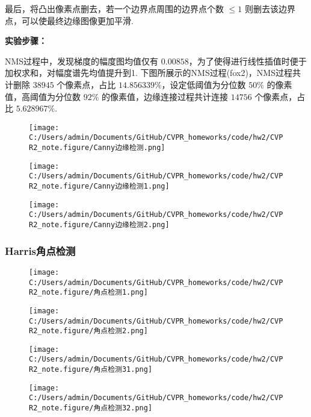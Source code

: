 \documentclass[
]{article}
\begin{document}
最后，将凸出像素点删去，若一个边界点周围的边界点个数 \(\leqslant 1\)
则删去该边界点，可以使最终边缘图像更加平滑.

\textbf{实验步骤：}

NMS过程中，发现梯度的幅度图均值仅有
\(0.00858\)，为了使得进行线性插值时便于加权求和，对幅度谱先均值提升到1.
下图所展示的NMS过程(fox2)，NMS过程共计删除 \(38945\) 个像素点，占比
\(14.856339\%\)，设定低阈值为分位数 \(50\%\) 的像素值，高阈值为分位数
\(92\%\) 的像素值，边缘连接过程共计连接 \(14756\) 个像素点，占比
\(5.628967\%\).

\begin{figure}
\centering
\texttt{[image: C:/Users/admin/Documents/GitHub/CVPR\_homeworks/code/hw2/CVPR2\_note.figure/Canny边缘检测.png]}
\caption{}
\end{figure}

\begin{figure}
\centering
\texttt{[image: C:/Users/admin/Documents/GitHub/CVPR\_homeworks/code/hw2/CVPR2\_note.figure/Canny边缘检测1.png]}
\caption{}
\end{figure}

\begin{figure}
\centering
\texttt{[image: C:/Users/admin/Documents/GitHub/CVPR\_homeworks/code/hw2/CVPR2\_note.figure/Canny边缘检测2.png]}
\caption{}
\end{figure}

\hypertarget{harrisux89d2ux70b9ux68c0ux6d4b}{%
\subsubsection{Harris角点检测}\label{harrisux89d2ux70b9ux68c0ux6d4b}}

\begin{figure}
\centering
\texttt{[image: C:/Users/admin/Documents/GitHub/CVPR\_homeworks/code/hw2/CVPR2\_note.figure/角点检测1.png]}
\caption{}
\end{figure}

\begin{figure}
\centering
\texttt{[image: C:/Users/admin/Documents/GitHub/CVPR\_homeworks/code/hw2/CVPR2\_note.figure/角点检测2.png]}
\caption{}
\end{figure}

\begin{figure}
\centering
\texttt{[image: C:/Users/admin/Documents/GitHub/CVPR\_homeworks/code/hw2/CVPR2\_note.figure/角点检测31.png]}
\caption{}
\end{figure}

\begin{figure}
\centering
\texttt{[image: C:/Users/admin/Documents/GitHub/CVPR\_homeworks/code/hw2/CVPR2\_note.figure/角点检测32.png]}
\caption{}
\end{figure}
\end{document}
